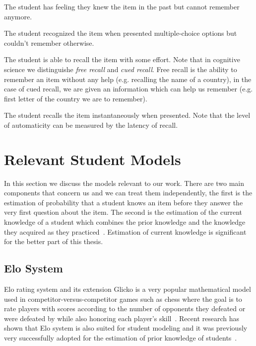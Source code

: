 \begin{description}[leftmargin=0cm]
  \item[Familiarity] The student has feeling they knew the item in the past but cannot remember anymore.
  \item[Recognition] The student recognized the item when presented multiple-choice options but couldn't remember otherwise.
  \item[Recall] The student is able to recall the item with some effort. Note that in cognitive science we distinguishe \textit{free recall} and \textit{cued recall}. Free recall is the ability to remember an item without any help (e.g. recalling the name of a country), in the case of cued recall, we are given an information which can help us remember (e.g. first letter of the country we are to remember).
  \item[Automaticity] The student recalls the item instantaneously when presented. Note that the level of automaticity can be measured by the latency of recall.
\end{description}

\section{Relevant Student Models}
\label{relevant-models}

In this section we discuss the models relevant to our work. There are two main components that concern us and we can treat them independently, the first is the estimation of probability that a student knows an item before they answer the very first question about the item. The second is the estimation of the current knowledge of a student which combines the prior knowledge and the knowledge they acquired as they practiced~\cite{Papousek2014}. Estimation of current knowledge is significant for the better part of this thesis.

\subsection{Elo System}
\label{elo}

Elo rating system and its extension Glicko is a very popular mathematical model used in competitor-versus-competitor games such as chess where the goal is to rate players with scores according to the number of opponents they defeated or were defeated by while also honoring each player's skill~\cite{Vanek2014}. Recent research has shown that Elo system is also suited for student modeling and it was previously very successfully adopted for the estimation of prior knowledge of students~\cite{Niznan2015}.

